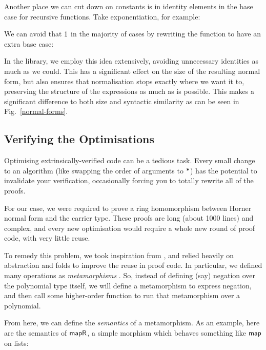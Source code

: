 \documentclass[acmsmall,review,anonymous]{acmart}\settopmatter{printfolios=true,printccs=false,printacmref=false}
\theoremstyle{remark}
\begin{document}
Another place we can cut down on constants is in identity elements in the base
case for recursive functions. Take exponentiation, for example:
\begin{center}
\end{center}
We can avoid that \(\AgdaNumber{1}\) in the majority of cases by rewriting the
function to have an extra base case:
\begin{multicols}{2}
  \centering
\end{multicols}
In the library, we employ this idea extensively, avoiding unnecessary identities
as much as we could. This has a significant effect on the size of the resulting
normal form, but also ensures that normalisation stops exactly where we want it
to, preserving the structure of the expressions as much as is possible. This
makes a significant difference to both size and syntactic
similarity as can be seen in Fig.~\ref{normal-forms}.
\subsection{Verifying the Optimisations}
Optimising extrinsically-verified code can be a tedious task. Every small change
to an algorithm (like swapping the order of arguments to \(\AgdaFunction{*}\))
has the potential to invalidate your verification, occasionally forcing you to
totally rewrite all of the proofs.

For our case, we were required to prove a ring homomorphism between Horner
normal form and the carrier type. These proofs are long (about 1000 lines) and
complex, and every new optimisation would require a whole new round of proof
code, with very little reuse.

To remedy this problem, we took inspiration from \citet{mu_algebra_2009}, and
relied heavily on abstraction and folds to improve the reuse in proof code. In
particular, we defined many operations as \emph{metamorphisms}
\cite{gibbons_metamorphisms_2007}. So, instead of defining (say) negation over
the polynomial type itself, we will define a metamorphism to express negation,
and then call some higher-order function to run that metamorphism over a
polynomial.
\begin{center}
\end{center}
From here, we can define the \emph{semantics} of a metamorphism. As an example,
here are the semantics of \(\AgdaFunction{mapR}\), a simple morphism which
behaves something like \(\AgdaFunction{map}\) on lists:
\end{document}

